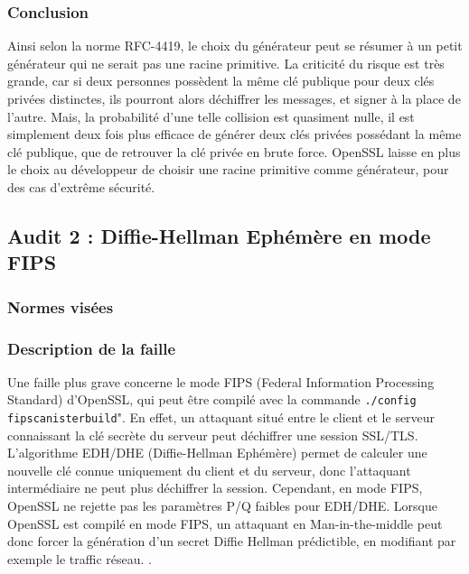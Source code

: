 		\subsubsection{Conclusion}

		Ainsi selon la norme RFC-4419, le choix du générateur peut se résumer à un petit générateur qui ne serait pas une racine primitive. La criticité du risque est très grande, car si deux personnes possèdent la même clé publique pour deux clés privées distinctes, ils pourront alors déchiffrer les messages, et signer à la place de l'autre. Mais, la probabilité d'une telle collision est quasiment nulle, il est simplement deux fois plus efficace de générer deux clés privées possédant la même clé publique, que de retrouver la clé privée en brute force.
		OpenSSL laisse en plus le choix au développeur de choisir une racine primitive comme générateur, pour des cas d'extrême sécurité.
		
	\subsection{Audit 2 : Diffie-Hellman Ephémère en mode FIPS}
		\subsubsection{Normes visées}


		\subsubsection{Description de la faille}
	
		Une faille plus grave concerne le mode FIPS (Federal Information Processing Standard) d'OpenSSL, qui peut être compilé avec la commande \texttt{./config fipscanisterbuild}". En effet, un attaquant situé entre le client et le serveur connaissant la clé secrète du serveur peut déchiffrer une session SSL/TLS. \\
	
		L'algorithme EDH/DHE (Diffie-Hellman Ephémère) permet de calculer une nouvelle clé connue uniquement du client et du serveur, donc l'attaquant intermédiaire ne peut plus déchiffrer la session. Cependant, en mode FIPS, OpenSSL ne rejette pas les paramètres P/Q faibles pour EDH/DHE. Lorsque OpenSSL est compilé en mode FIPS, un attaquant en Man-in-the-middle peut donc forcer la génération d'un secret Diffie Hellman prédictible, en modifiant par exemple le traffic réseau. \cite{vigilance-vul-10585} \cite{CVE-2011-5095}.

